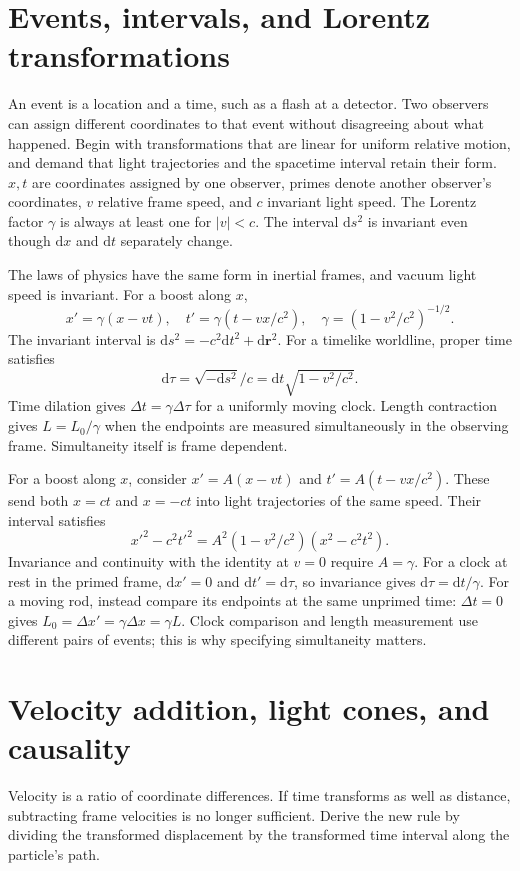 \documentclass[11pt,oneside]{book}
\newcommand{\dd}{\mathrm{d}}
\newcommand{\vect}[1]{\boldsymbol{#1}}
\theoremstyle{reviewstyle}
\begin{document}
\section{Events, intervals, and Lorentz transformations}
An event is a location and a time, such as a flash at a detector. Two observers can assign different coordinates to that event without disagreeing about what happened. Begin with transformations that are linear for uniform relative motion, and demand that light trajectories and the spacetime interval retain their form. $x,t$ are coordinates assigned by one observer, primes denote another observer's coordinates, $v$ relative frame speed, and $c$ invariant light speed. The Lorentz factor $\gamma$ is always at least one for $|v|<c$. The interval $\dd s^2$ is invariant even though $\dd x$ and $\dd t$ separately change.

The laws of physics have the same form in inertial frames, and vacuum light speed is invariant. For a boost along $x$,
\begin{equation}
x'=\gamma(x-vt),\quad t'=\gamma(t-vx/c^2),\quad
\gamma=(1-v^2/c^2)^{-1/2}.
\end{equation}
The invariant interval is $\dd s^2=-c^2\dd t^2+\dd\vect r^2$. For a timelike worldline, proper time satisfies
\begin{equation}\dd\tau=\sqrt{-\dd s^2}/c=\dd t\sqrt{1-v^2/c^2}.\end{equation}
Time dilation gives $\Delta t=\gamma\Delta\tau$ for a uniformly moving clock. Length contraction gives $L=L_0/\gamma$ when the endpoints are measured simultaneously in the observing frame. Simultaneity itself is frame dependent.

For a boost along $x$, consider $x'=A(x-vt)$ and $t'=A(t-vx/c^2)$. These send both $x=ct$ and $x=-ct$ into light trajectories of the same speed. Their interval satisfies
\begin{equation}
x'^2-c^2t'^2=A^2(1-v^2/c^2)(x^2-c^2t^2).
\end{equation}
Invariance and continuity with the identity at $v=0$ require $A=\gamma$. For a clock at rest in the primed frame, $\dd x'=0$ and $\dd t'=\dd\tau$, so invariance gives $\dd\tau=\dd t/\gamma$. For a moving rod, instead compare its endpoints at the same unprimed time: $\Delta t=0$ gives $L_0=\Delta x'=\gamma\Delta x=\gamma L$. Clock comparison and length measurement use different pairs of events; this is why specifying simultaneity matters.

\section{Velocity addition, light cones, and causality}
Velocity is a ratio of coordinate differences. If time transforms as well as distance, subtracting frame velocities is no longer sufficient. Derive the new rule by dividing the transformed displacement by the transformed time interval along the particle's path.
\end{document}
